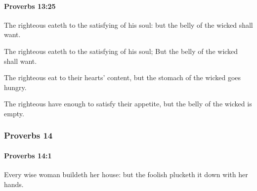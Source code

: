 		\paragraph{Proverbs 13:25} %
			\label{PROVERBS-13-25}

			The righteous eateth to the satisfying of his soul: but the belly of the wicked shall want.

			\begin{versebox}
					\item[BHS] 
					\item[ASV] The righteous eateth to the satisfying of his soul; But the belly of the wicked shall want.
					\item[NIV] The righteous eat to their hearts’ content, but the stomach of the wicked goes hungry.
					\item[NRSV] The righteous have enough to satisfy their appetite, but the belly of the wicked is empty.
			\end{versebox}
	\subsubsection{Proverbs 14} %
		\label{PROVERBS-14}

		\paragraph{Proverbs 14:1} %
			\label{PROVERBS-14-1}

			Every wise woman buildeth her house: but the foolish plucketh it down with her hands.

